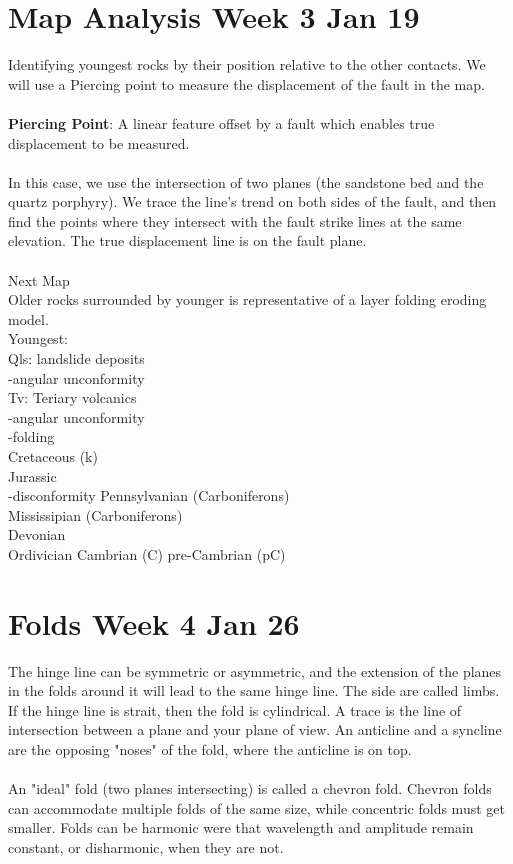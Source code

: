 \documentclass[12pt,a4paper]{report}
\begin{document}
\section*{Map Analysis Week 3 Jan 19}
Identifying youngest rocks by their position relative to the other contacts.
We will use a Piercing point to measure the displacement of the fault in the map.\\
\\
\textbf{Piercing Point}: A linear feature offset by a fault which enables true displacement to be measured.\\
\\
In this case, we use the intersection of two planes (the sandstone bed and the quartz porphyry).
We trace the line's trend on both sides of the fault, and then find the points where they intersect with the fault strike lines at the same elevation.
The true displacement line is on the fault plane.\\
\\
Next Map\\
Older rocks surrounded by younger is representative of a layer folding eroding model.\\
Youngest:\\
Qls: landslide deposits\\
-angular unconformity\\
Tv: Teriary volcanics\\
-angular unconformity\\
-folding\\
Cretaceous (k)\\
Jurassic\\
-disconformity
Pennsylvanian (Carboniferons)\\
Mississipian (Carboniferons)\\
Devonian\\
Ordivician
Cambrian (C)
pre-Cambrian (pC)




\section*{Folds Week 4 Jan 26}
The hinge line can be symmetric or asymmetric, and the extension of the planes in the folds around it will lead to the same hinge line.
The side are called limbs. If the hinge line is strait, then the fold is cylindrical.
A trace is the line of intersection between a plane and your plane of view.
An anticline and a syncline are the opposing "noses" of the fold, where the anticline is on top.\\
\\
An "ideal" fold (two planes intersecting) is called a chevron fold.
Chevron folds can accommodate multiple folds of the same size, while concentric folds must get smaller.
Folds can be harmonic were that wavelength and amplitude remain constant, or disharmonic, when they are not.
\end{document}
